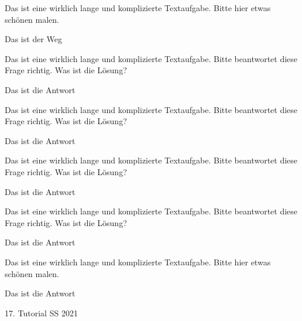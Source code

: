 \documentclass[addpoints,a4paper,12pt]{exam} %
\begin{document}
\begin{questions}
		\question Das ist eine wirklich lange und komplizierte Textaufgabe. Bitte hier etwas schönen malen.
		\smallskip
		\begin{solutionorgrid}[2cm]
			Das ist der Weg
		\end{solutionorgrid}
		
		\question Das ist eine wirklich lange und komplizierte Textaufgabe. Bitte beantwortet diese Frage richtig. Was ist die Lösung?
		\begin{solution}[2cm]
			Das ist die Antwort
		\end{solution}
		
		\question Das ist eine wirklich lange und komplizierte Textaufgabe. Bitte beantwortet diese Frage richtig. Was ist die Lösung?
		\begin{solutionorbox}[2cm]
			Das ist die Antwort
		\end{solutionorbox}
		
		\question Das ist eine wirklich lange und komplizierte Textaufgabe. Bitte beantwortet diese Frage richtig. Was ist die Lösung?
		\begin{solutionorlines}[2cm]
			Das ist die Antwort
		\end{solutionorlines}
		
		\question Das ist eine wirklich lange und komplizierte Textaufgabe. Bitte beantwortet diese Frage richtig. Was ist die Lösung?
		\begin{solutionordottedlines}[2cm]
			Das ist die Antwort
		\end{solutionordottedlines}
		
		\question Das ist eine wirklich lange und komplizierte Textaufgabe. Bitte hier etwas schönen malen.
		\smallskip
		\begin{solutionorgrid}[2cm]
			Das ist die Antwort
		\end{solutionorgrid}17. Tutorial SS 2021
		
		\newpage
		\begin{center}
			\gradetable[v][questions]
		\end{center}
		
	
	\end{questions}
\end{document}
